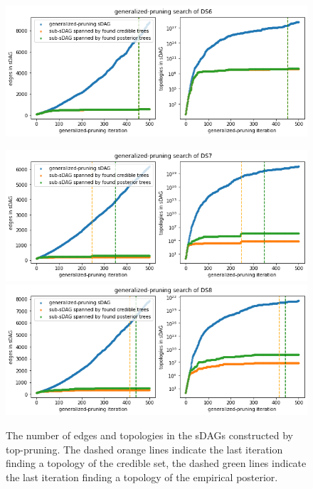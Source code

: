 \documentclass{article}
\begin{document}
\begin{figure}[!hb]
\vspace{-1.2ex}
\includegraphics[scale=0.4]{figures/gp_ds6_counts.png}
\end{figure}
\begin{figure}[!t]\centering
\includegraphics[scale=0.4]{figures/gp_ds7_counts.png}
\includegraphics[scale=0.4]{figures/gp_ds8_counts.png}
\caption{The number of edges and topologies in the sDAGs constructed by top-pruning.
The dashed orange lines indicate the last iteration finding a topology of the credible set, the dashed green lines indicate the last iteration finding a topology of the empirical posterior. }
\label{fig:generalizedPruningCounts}
\end{figure}
\end{document}
